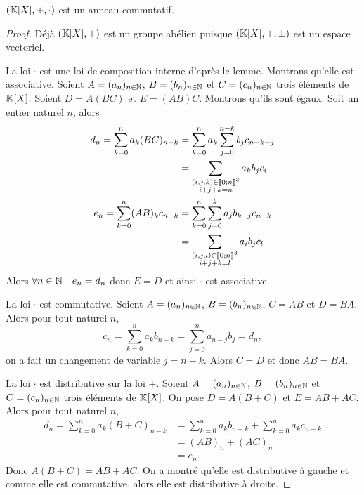 \begin{theo}
  \((\mathbb{K}[X],+,\cdot)\) est un anneau commutatif.
\end{theo}
\begin{proof}
  Déjà \((\mathbb{K}[X],+)\) est un groupe abélien puisque \((\mathbb{K}[X],+,\perp)\) est un 
  espace vectoriel.

  La loi \(\cdot\) est une loi de composition interne d'après le lemme. Montrons 
  qu'elle est associative. Soient \(A = (a_n)_{n \in \mathbb{N}}\), \(B = (b_n)_{n \in \mathbb{N}}\) 
  et \(C = (c_n)_{n \in \mathbb{N}}\) trois éléments de \(\mathbb{K}[X]\). Soient \(D = A(BC)\) et 
  \(E = (AB)C\). Montrons qu'ils sont égaux. Soit un entier naturel \(n\), alors
  \begin{align}
    d_n = \sum_{k = 0}^n a_k (BC)_{n-k} &= \sum_{k = 0}^n a_k \sum_{j = 0}^{n-k} b_j 
    c_{n-k-j} \\
    & = \sum_{\substack{(i,j,k)\in \mathopen{\llbracket}0\mathclose{}\mathpunct{};n\mathclose{\rrbracket}^3 \\  i+j+k = n}} a_k b_j 
    c_i \\
    e_n = \sum_{k = 0}^n (AB)_k c_{n-k} &= \sum_{k = 0}^n \sum_{j = 0}^{k} a_j  
    b_{k-j} c_{n-k} \\
    & = \sum_{\substack{(i,j,l)\in \mathopen{\llbracket}0\mathclose{}\mathpunct{};n\mathclose{\rrbracket}^3 \\  i+j+k = l}} a_i b_j 
    c_l \\
  \end{align}
  Alors \(\forall n \in \mathbb{N} \quad e_n = d_n\) donc \(E = D\) et ainsi \(\cdot\) est 
  associative.

  La loi \(\cdot\) est commutative. Soient \(A = (a_n)_{n \in \mathbb{N}}\), \(B = (b_n)_{n 
  \in \mathbb{N}}\), \(C = AB\) et \(D = BA\). Alors pour tout naturel \(n\),
  \begin{equation}
    c_n = \sum_{k = 0}^n a_k b_{n-k} = \sum_{j = 0}^n a_{n-j} b_{j} =d_n,
  \end{equation}
  on a fait un changement de variable \(j = n-k\). Alors \(C = D\) et donc 
  \(AB = BA\).

  La loi \(\cdot\) est distributive sur la loi \(+\). Soient \(A = (a_n)_{n \in 
  \mathbb{N}}\), \(B = (b_n)_{n \in \mathbb{N}}\) et \(C = (c_n)_{n \in \mathbb{N}}\) trois éléments de 
  \(\mathbb{K}[X]\). On pose \(D = A(B+C)\) et \(E = AB+AC\). Alors pour tout naturel \(n\),
  \begin{align}
    d_n = \sum_{k = 0}^n a_k(B+C)_{n-k} &= \sum_{k = 0}^n a_k b_{n-k} + \sum_{k = 0}^n 
    a_k c_{n-k} \\
    & = (AB)_n +(AC)_n \\
    & = e_n.
  \end{align}
  Donc \(A(B+C) = AB+AC\). On a montré qu'elle est distributive à gauche et comme 
  elle est commutative, alors elle est distributive à droite.


\end{proof}

